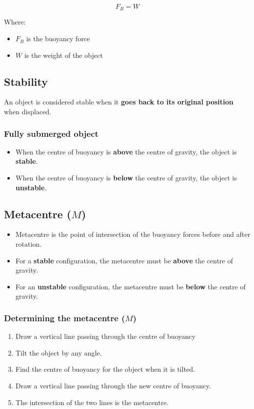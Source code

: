 \documentclass[11pt]{article}
\begin{document}
\[F_B = W\]

Where:
\begin{itemize}
\item \(F_B\) is the buoyancy force
\item \(W\) is the weight of the object
\end{itemize}
\subsection{Stability}
\label{sec:orgf7b1085}
An object is considered stable when it \textbf{goes back to its original position} when displaced.
\subsubsection{Fully submerged object}
\label{sec:org9c7f59d}
\begin{itemize}
\item When the centre of buoyancy is \textbf{above} the centre of gravity, the object is \textbf{stable}.
\item When the centre of buoyancy is \textbf{below} the centre of gravity, the object is \textbf{unstable}.
\end{itemize}
\subsection{Metacentre (\(M\))}
\label{sec:org9a6aa54}
\begin{itemize}
\item Metacentre is the point of intersection of the buoyancy forces before and after rotation.
\item For a \textbf{stable} configuration, the metacentre must be \textbf{above} the centre of gravity.
\item For an \textbf{unstable} configuration, the metacentre must be \textbf{below} the centre of gravity.
\end{itemize}
\subsubsection{Determining the metacentre (\(M\))}
\label{sec:org158c6fa}
\begin{enumerate}
\item Draw a vertical line passing through the centre of buoyancy
\item Tilt the object by any angle.
\item Find the centre of buoyancy for the object when it is tilted.
\item Draw a vertical line passing through the new centre of buoyancy.
\item The intersection of the two lines is the metacentre.
\end{enumerate}
\end{document}
